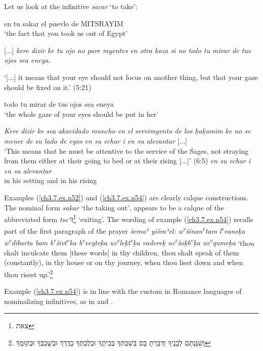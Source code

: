 \documentclass[output=paper,colorlinks,citecolor=brown,babel,arabicfont]{langscibook}
\begin{document}
Let us look at the infinitive \textit{sacar} `to take':

\ea\label{ch3.7.ex.n51}
en tu  sakar el puevlo de MITSRAYIM \\
`the fact that you took us out of Egypt'
\z

\ea\label{ch3.7.ex.n52}
{[...]} \textit{kere dizir ke tu ojo no pare myentes en otra koza si no todo tu mirar de tus ojos sea eneya.}

`{[...]} it means that your eye should not focus on another thing, but that your gaze should be fixed on it.' (5:21)
\z

\ea\label{ch3.7.ex.n53}
todo tu  mirar 	  de tus ojos sea eneya \\
`the whole gaze of your eyes should be put in her'
\z

\ea
\ea\label{ch3.7.ex.n54}
\textit{Kere dizir ke sea akavidado muncho en el servimyento de los ḥa\b{k}amim ke no se menee de su lado de eyos en su echar i en su alevantar} {[...]} \\
`This means that he must be attentive to the service of the Sages, not straying from them either at their going to bed or at their rising {[...]}' (6:5)
\ex\label{ch3.7.ex.n54b}
\textit{en su echar i  en su  alevantar} \\
in his setting and in his rising
\z
\z

Examples (\ref{ch3.7.ex.n52}) and (\ref{ch3.7.ex.n54}) are clearly calque  constructions. The nominal form \textit{sakar} `the taking out', appears to be a calque of the abbreviated  form \textit{tseʾt}\footnote{\texthebrew{צאת}} `exiting'. The wording of example (\ref{ch3.7.ex.n54}) recalls part of the first paragraph of the prayer \textit{šemaʿ yiśraʾel: w\textsuperscript{e}šinan\textsuperscript{e}tam l\textsuperscript{e}vane\b{k}a w\textsuperscript{e}dibarta bam b\textsuperscript{e}šivt\textsuperscript{e}ka b\textsuperscript{e}veyte\b{k}a uv\textsuperscript{e}le\b{k}t\textsuperscript{e}\b{k}a vadere\b{k} uv\textsuperscript{e}šo\b{k}b\textsuperscript{e}\b{k}a uv\textsuperscript{e}qume\b{k}a} `thou shalt inculcate them [these words] in thy children, thou shalt speak of them (constantly), in thy house or on thy journey, when thou liest down and when thou risest up.'\footnote{\texthebrew{וְשִׁנַּנְתָּם לְבָנֶיךָ וְדִבַּרְתָּ בָּם בְּשִׁבְתְּךָ בְּבֵיתֶךָ וּבְלֶכְתְּךָ בַדֶּרֶךְ וּבְשָׁכְבְּךָ וּבְקוּמֶךָ}}

Example (\ref{ch3.7.ex.n54}) is in line with the custom in Romance languages of nominalizing infinitives, as in  and .
\end{document}
